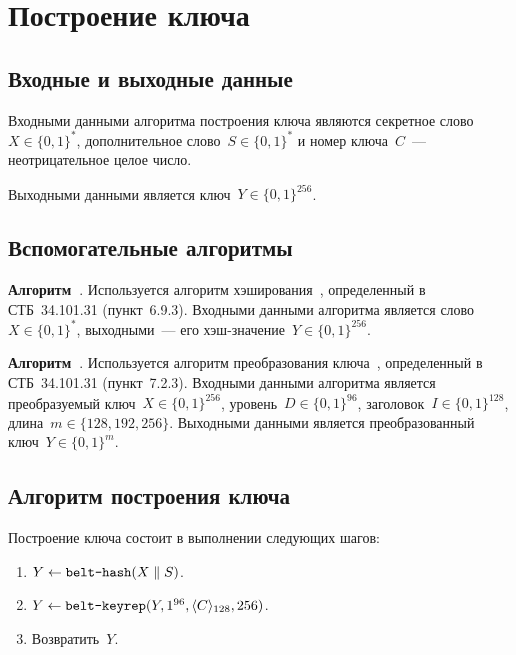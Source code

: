 \section{Построение ключа}\label{KDF}

\subsection{Входные и выходные данные}

Входными данными алгоритма построения ключа являются
секретное слово~$X\in\{0,1\}^*$, 
дополнительное слово~$S\in\{0,1\}^*$
и номер ключа~$C$~--- неотрицательное целое число.

Выходными данными является ключ~$Y\in\{0,1\}^{256}$.

\subsection{Вспомогательные алгоритмы}\label{KDF.Aux}

{\bf Алгоритм~}.
Используется алгоритм хэширования~,
определенный в СТБ~34.101.31 (пункт~6.9.3).
Входными данными алгоритма является слово~$X\in\{0,1\}^*$,
выходными~--- его хэш-значение~$Y\in\{0,1\}^{256}$.

{\bf Алгоритм~}.
Используется алгоритм преобразования ключа~,
определенный в СТБ~34.101.31 (пункт~7.2.3).
%
Входными данными алгоритма является 
преобразуемый ключ~$X\in\{0,1\}^{256}$,
уровень~$D\in\{0,1\}^{96}$, заголовок~$I\in\{0,1\}^{128}$,
длина~$m\in\{128,192,256\}$.
%
Выходными данными является 
преобразованный ключ~$Y\in\{0,1\}^m$.

\subsection{Алгоритм построения ключа}\label{KDF.Alg}

Построение ключа состоит в выполнении следующих шагов:
\begin{enumerate}
\item
$Y\leftarrow\texttt{belt-hash}(X\parallel S)$.

\item
$Y\leftarrow\texttt{belt-keyrep}(Y,1^{96},\langle C\rangle_{128},256)$.

\item
Возвратить~$Y$.
\end{enumerate}
